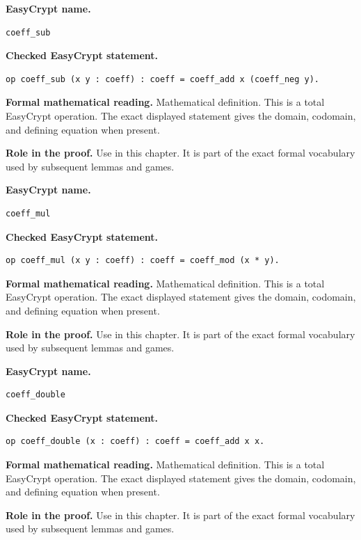 \begin{formaldefinition}
\noindent\textbf{EasyCrypt name.}
\begin{lstlisting}[language=EasyCrypt,basicstyle=\ttfamily\scriptsize]
coeff_sub
\end{lstlisting}
\noindent\textbf{Checked EasyCrypt statement.}
\begin{lstlisting}[language=EasyCrypt,basicstyle=\ttfamily\scriptsize]
op coeff_sub (x y : coeff) : coeff = coeff_add x (coeff_neg y).
\end{lstlisting}
\noindent\textbf{Formal mathematical reading.}
Mathematical definition. This is a total EasyCrypt operation.  The exact displayed statement gives the domain, codomain, and defining equation when present.

\noindent\textbf{Role in the proof.}
Use in this chapter. It is part of the exact formal vocabulary used by subsequent lemmas and games.

\end{formaldefinition}

\begin{formaldefinition}
\noindent\textbf{EasyCrypt name.}
\begin{lstlisting}[language=EasyCrypt,basicstyle=\ttfamily\scriptsize]
coeff_mul
\end{lstlisting}
\noindent\textbf{Checked EasyCrypt statement.}
\begin{lstlisting}[language=EasyCrypt,basicstyle=\ttfamily\scriptsize]
op coeff_mul (x y : coeff) : coeff = coeff_mod (x * y).
\end{lstlisting}
\noindent\textbf{Formal mathematical reading.}
Mathematical definition. This is a total EasyCrypt operation.  The exact displayed statement gives the domain, codomain, and defining equation when present.

\noindent\textbf{Role in the proof.}
Use in this chapter. It is part of the exact formal vocabulary used by subsequent lemmas and games.

\end{formaldefinition}

\begin{formaldefinition}
\noindent\textbf{EasyCrypt name.}
\begin{lstlisting}[language=EasyCrypt,basicstyle=\ttfamily\scriptsize]
coeff_double
\end{lstlisting}
\noindent\textbf{Checked EasyCrypt statement.}
\begin{lstlisting}[language=EasyCrypt,basicstyle=\ttfamily\scriptsize]
op coeff_double (x : coeff) : coeff = coeff_add x x.
\end{lstlisting}
\noindent\textbf{Formal mathematical reading.}
Mathematical definition. This is a total EasyCrypt operation.  The exact displayed statement gives the domain, codomain, and defining equation when present.

\noindent\textbf{Role in the proof.}
Use in this chapter. It is part of the exact formal vocabulary used by subsequent lemmas and games.

\end{formaldefinition}


